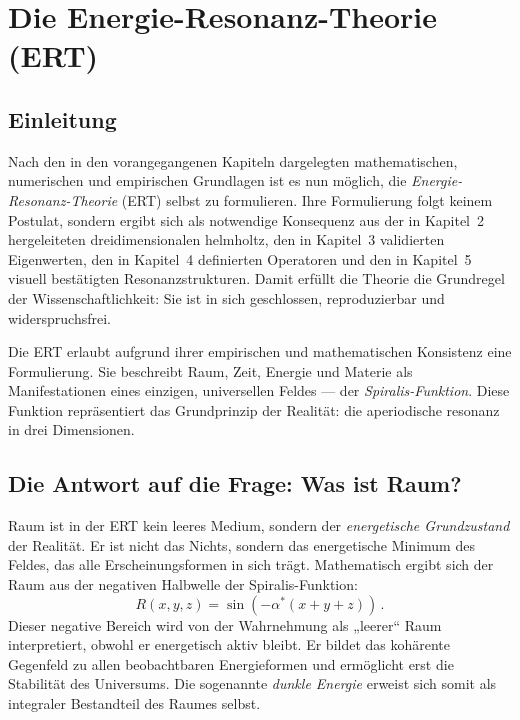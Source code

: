 \chapter{Die Energie-Resonanz-Theorie (\acrshort{ERT})}
\label{chap:ert}

\section{Einleitung}
Nach den in den vorangegangenen Kapiteln dargelegten mathematischen, numerischen und empirischen Grundlagen ist es nun möglich, die \textit{Energie-Resonanz-Theorie} (\acrshort{ERT}) selbst zu formulieren. 
Ihre Formulierung folgt keinem Postulat, sondern ergibt sich als notwendige Konsequenz aus der in Kapitel~2 hergeleiteten dreidimensionalen \gls{helmholtz}, den in Kapitel~3 validierten Eigenwerten, den in Kapitel~4 definierten Operatoren und den in Kapitel~5 visuell bestätigten Resonanzstrukturen.  
Damit erfüllt die Theorie die Grundregel der Wissenschaftlichkeit: Sie ist in sich geschlossen, reproduzierbar und widerspruchsfrei.  

Die \acrshort{ERT} erlaubt aufgrund ihrer empirischen und mathematischen Konsistenz eine Formulierung. 
Sie beschreibt Raum, Zeit, Energie und Materie als Manifestationen eines einzigen, universellen Feldes — der \textit{Spiralis-Funktion}. 
Diese Funktion repräsentiert das Grundprinzip der Realität: die aperiodische \gls{resonanz} in drei Dimensionen.

\section{Die Antwort auf die Frage: Was ist Raum?}
Raum ist in der \acrshort{ERT} kein leeres Medium, sondern der \emph{energetische Grundzustand} der Realität.  
Er ist nicht das Nichts, sondern das energetische Minimum des Feldes, das alle Erscheinungsformen in sich trägt.  
Mathematisch ergibt sich der Raum aus der negativen Halbwelle der Spiralis-Funktion:
\[
R(x,y,z) = \sin(-\alpha^*(x+y+z)) \, .
\]
Dieser negative Bereich wird von der Wahrnehmung als „leerer“ Raum interpretiert, obwohl er energetisch aktiv bleibt.  
Er bildet das kohärente Gegenfeld zu allen beobachtbaren Energieformen und ermöglicht erst die Stabilität des Universums.  
Die sogenannte \textit{dunkle Energie} erweist sich somit als integraler Bestandteil des Raumes selbst.

